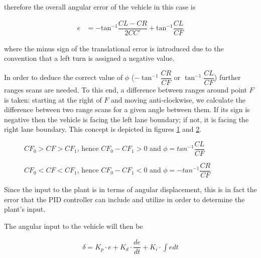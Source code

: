 therefore the overall angular error of the vehicle in this case is

\begin{align}
  e &= -\text{tan}^{-1}\dfrac{CL-CR}{2CC'} + \text{tan}^{-1}\dfrac{CL}{CF}
\end{align}

where the minus sign of the translational error is introduced due to the
convention that a left turn is assigned a negative value.


In order to deduce the correct value of $\phi$ ($-\tan^{-1}\dfrac{CR}{CF}$ or
$\tan^{-1}\dfrac{CL}{CF}$) further ranges scans are needed. To this end,
a difference between ranges around point $F$ is taken: starting at the
right of $F$ and moving anti-clockwise, we calculate the difference between
two range scans for a given angle between them. If its sign
is negative then the vehicle is facing the left lane boundary; if not,
it is facing the right lane boundary. This concept is depicted in figures
\ref{fig:range_diff_positive} and  \ref{fig:range_diff_negative}.

\begin{figure}[H]\centering
  \scalebox{1}{}
  \caption{$CF_0 > CF > CF_1$, hence $CF_0 - CF_1 > 0$ and $\phi = tan^{-1} \dfrac{CL}{CF}$}
  \label{fig:range_diff_positive}
\end{figure}

\begin{figure}[H]\centering
  \scalebox{1}{}
  \caption{$CF_0 < CF < CF_1$, hence $CF_0 - CF_1 < 0$ and $\phi = -tan^{-1} \dfrac{CR}{CF}$}
  \label{fig:range_diff_negative}
\end{figure}


Since the input to the plant is in terms of angular displacement, this
is in fact the error that the PID controller can include and utilize in
order to determine the plant's input.

The angular input to the vehicle will then be

\begin{align}
  \delta = K_p \cdot e + K_d \cdot \dfrac{de}{dt} + K_i \cdot \int e dt
\end{align}






